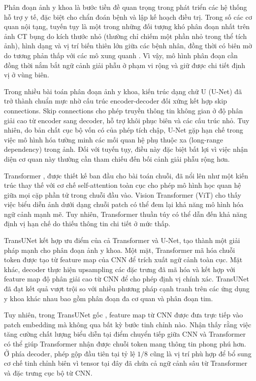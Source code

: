 \documentclass[10pt,a4paper]{article}
\begin{document}
Phân đoạn ảnh y khoa là bước tiền đề quan trọng trong phát triển các hệ thống hỗ trợ y tế, đặc biệt cho chẩn đoán bệnh và lập kế hoạch điều trị. Trong số các cơ quan nội tạng, tuyến tụy là một trong những đối tượng khó phân đoạn nhất trên ảnh CT bụng do kích thước nhỏ (thường chỉ chiếm một phần nhỏ trong thể tích ảnh), hình dạng và vị trí biến thiên lớn giữa các bệnh nhân, đồng thời có biên mờ do tương phản thấp với các mô xung quanh \cite{yu2018rstn,moglia2025pancreasreview}. Vì vậy, mô hình phân đoạn cần đồng thời nắm bắt ngữ cảnh giải phẫu ở phạm vi rộng và giữ được chi tiết định vị ở vùng biên.

Trong nhiều bài toán phân đoạn ảnh y khoa, kiến trúc dạng chữ U (U-Net) \cite{ronneberger2015unet} đã trở thành chuẩn mực nhờ cấu trúc encoder-decoder đối xứng kết hợp skip connections. Skip connections cho phép truyền thông tin không gian ở độ phân giải cao từ encoder sang decoder, hỗ trợ khôi phục biên và các cấu trúc nhỏ. Tuy nhiên, do bản chất cục bộ vốn có của phép tích chập, U-Net gặp hạn chế trong việc mô hình hóa tường minh các mối quan hệ phụ thuộc xa (long-range dependency) trong ảnh. Đối với tuyến tụy, điều này đặc biệt bất lợi vì việc nhận diện cơ quan này thường cần tham chiếu đến bối cảnh giải phẫu rộng hơn.

Transformer \cite{vaswani2017attention}, được thiết kế ban đầu cho bài toán chuỗi, đã nổi lên như một kiến trúc thay thế với cơ chế self-attention toàn cục cho phép mô hình học quan hệ giữa mọi cặp phần tử trong chuỗi đầu vào. Vision Transformer (ViT) \cite{dosovitskiy2021vit} cho thấy việc biểu diễn ảnh dưới dạng chuỗi patch có thể đem lại khả năng mô hình hóa ngữ cảnh mạnh mẽ. Tuy nhiên, Transformer thuần túy có thể dẫn đến khả năng định vị hạn chế do thiếu thông tin chi tiết ở mức thấp.

TransUNet \cite{chen2021transunet} kết hợp ưu điểm của cả Transformer và U-Net, tạo thành một giải pháp mạnh cho phân đoạn ảnh y khoa. Một mặt, Transformer mã hóa chuỗi token được tạo từ feature map của CNN để trích xuất ngữ cảnh toàn cục. Mặt khác, decoder thực hiện upsampling các đặc trưng đã mã hóa và kết hợp với feature map độ phân giải cao từ CNN để cho phép định vị chính xác. TransUNet đã đạt kết quả vượt trội so với nhiều phương pháp cạnh tranh trên các ứng dụng y khoa khác nhau bao gồm phân đoạn đa cơ quan và phân đoạn tim.

Tuy nhiên, trong TransUNet gốc \cite{chen2021transunet}, feature map từ CNN được đưa trực tiếp vào patch embedding mà không qua bất kỳ bước tinh chỉnh nào. Nhận thấy rằng việc tăng cường chất lượng biểu diễn tại điểm chuyển tiếp giữa CNN và Transformer có thể giúp Transformer nhận được chuỗi token mang thông tin phong phú hơn. Ở phía decoder, phép gộp đầu tiên tại tỷ lệ $1/8$ cũng là vị trí phù hợp để bổ sung cơ chế tinh chỉnh biên vì tensor tại đây đã chứa cả ngữ cảnh sâu từ Transformer và đặc trưng cục bộ từ CNN.
\end{document}

